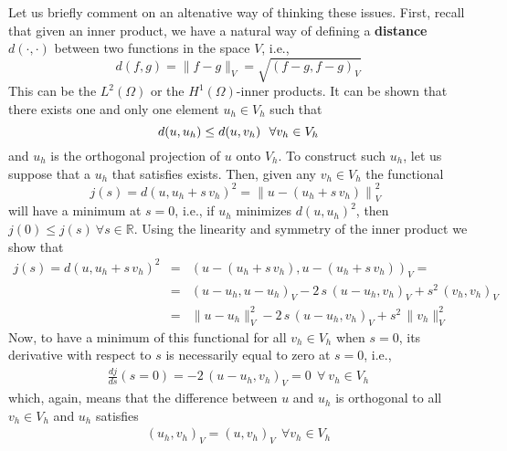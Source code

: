Let us briefly comment on an altenative way of thinking these issues.
First, recall that given an inner product, we have a natural way
of defining a \textbf{distance} $d(\cdot, \cdot)$ between two functions
in the space $V$, i.e.,
\begin{equation}
 d(f,g) = \lVert f - g \rVert_V = \sqrt{(f-g,f-g)_V}\nonumber
\end{equation}
This can be the $L^2(\Omega)$ or the $H^1(\Omega)$-inner products.
It can be shown that there exists one and only one element $u_h \in V_h$ such that 
\begin{equation}    
 d(u,u_h) \le d(u,v_h)~~ \forall v_h \in V_h \labeq{d_le_d}
\end{equation}
and $u_h$ is the orthogonal projection of $u$ onto $V_h$.
To construct such $u_h$, let us suppose that a $u_h$ that satisfies  exists.
Then, given any $v_h \in V_h$ the functional
\begin{equation}
 j(s) = d(u,u_h + s\,v_h)^2 = \left \| u - (u_h + s\,v_h ) \right \|_V^2~~
\end{equation}
will have a minimum at $s = 0$, i.e., 
if $u_h$ minimizes $d(u,u_h)^2$, then $j(0) \le j(s)~\forall s \in \mathbb{R}$. 
Using the linearity and symmetry of the inner product we show that
\begin{eqnarray}
 j(s) = d(u,u_h + s\,v_h)^2 & = &  \left ( u - (u_h + s\,v_h), u - (u_h + s\,v_h) \right )_V = \nonumber \\ 
 & =& (u - u_h, u- u_h)_V  - 2 \, s \, (u-u_h,v_h)_V + s^2 \, (v_h,v_h)_V \nonumber \\
 & = & \lVert u -u_h \rVert^2_V - 2 \, s \, (u-u_h,v_h)_V +  s^2 \, \lVert v_h \rVert^2_V  \nonumber
 \end{eqnarray}
Now, to have a minimum of this functional for all $v_h \in V_h$ 
when $s = 0$, its derivative with respect to $s$ is 
necessarily equal to zero at $s=0$, i.e.,
\begin{eqnarray}
 \frac{dj}{ds}(s=0) = - 2 \, (u-u_h,v_h)_V = 0 ~~\forall~v_h \in V_h \nonumber
\end{eqnarray}
which, again, means that the difference between $u$ and $u_h$ is orthogonal
to all $v_h \in V_h$ and $u_h$ satisfies
\begin{eqnarray}
  (u_h,v_h)_V = (u,v_h)_V  ~~\forall v_h \in V_h\nonumber
\end{eqnarray}

